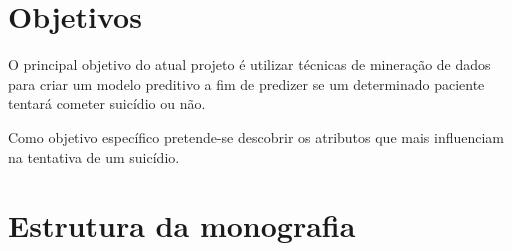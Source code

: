 \section{Objetivos}
\label{sec:objetivos}
O principal objetivo do atual projeto é utilizar técnicas de mineração de dados para criar um modelo preditivo a fim de predizer se um determinado paciente tentará cometer suicídio ou não. 

Como objetivo específico pretende-se descobrir os atributos que mais influenciam na tentativa de um suicídio.

\section{Estrutura da monografia}
